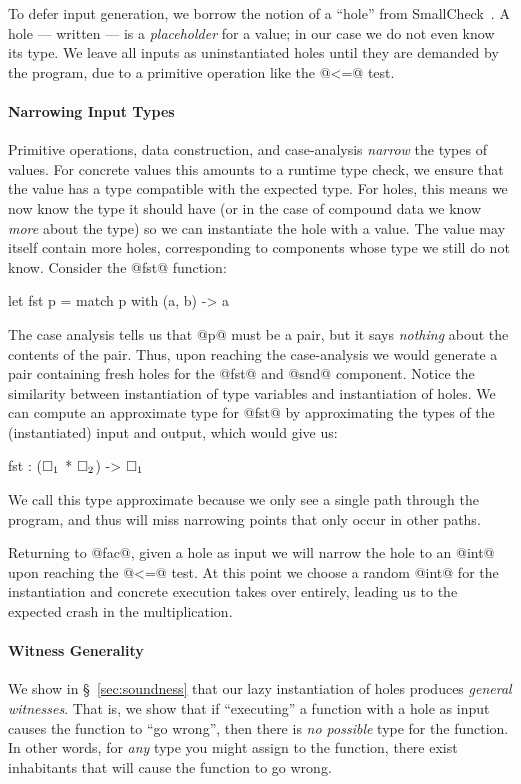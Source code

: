 To defer input generation, we borrow the notion of a ``hole'' from
SmallCheck~\cite{runciman_smallcheck_2008}.
%
A hole --- written \ehole{} --- is a \emph{placeholder} for a value; in
our case we do not even know its type.
%
We leave all inputs as uninstantiated holes until they are demanded by
the program, \eg due to a primitive operation like the @<=@ test.

\paragraph{Narrowing Input Types}
Primitive operations, data construction, and case-analysis \emph{narrow}
the types of values.
%
For concrete values this amounts to a runtime type check, we ensure that
the value has a type compatible with the expected type.
%
For holes, this means we now know the type it should
have (or in the case of compound data we know \emph{more} about the
type) so we can instantiate the hole with a value.
%
The value may itself contain more holes, corresponding to components
whose type we still do not know.
%
Consider the @fst@ function:
%
\begin{code}
  let fst p = match p with
    (a, b) -> a
\end{code}
%
The case analysis tells us that @p@ must be a pair, but it says
\emph{nothing} about the contents of the pair.
%
Thus, upon reaching the case-analysis we would generate a pair
containing fresh holes for the @fst@ and @snd@ component.
%
Notice the similarity between instantiation of type variables and
instantiation of holes.
%
We can compute an approximate type for @fst@ by approximating the types
of the (instantiated) input and output, which would give us:
%
\begin{mcode}
  fst : ($\square_{1}$ * $\square_{2}$) -> $\square_{1}$
\end{mcode}
%
We call this type approximate because we only see a single path through
the program, and thus will miss narrowing points that only occur in
other paths.

Returning to @fac@, given a hole as input we will narrow the hole
to an @int@ upon reaching the @<=@ test.
%
At this point we choose a random @int@ for the instantiation and
concrete execution takes over entirely, leading us to the expected crash
in the multiplication.

\paragraph{Witness Generality}
We show in \S~\ref{sec:soundness} that our lazy instantiation of holes
produces \emph{general witnesses}.
%
That is, we show that if ``executing''
a function with a hole as input causes the
function to ``go wrong'', then there is
\emph{no possible} type for the function.
%
In other words, for \emph{any} type you might
assign to the function, there exist inhabitants
that will cause the function to go wrong.

